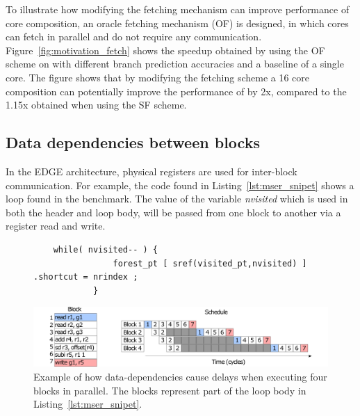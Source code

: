To illustrate how modifying the fetching mechanism can improve performance of core composition, an oracle fetching mechanism (OF) is designed, in which cores can fetch in parallel and do not require any communication.
Figure~\ref{fig:motivation_fetch} shows the speedup obtained by using the OF scheme on  with different branch prediction accuracies and a baseline of a single core.
The figure shows that by modifying the fetching scheme a 16 core composition can potentially improve the performance of  by 2x, compared to the 1.15x obtained when using the SF scheme.

\subsection{Data dependencies between blocks}

In the EDGE architecture, physical registers are used for inter-block communication.
For example, the code found in Listing~\ref{lst:mser_snipet} shows a loop found in the  benchmark.
The value of the variable \textit{nvisited} which is used in both the header and loop body, will be passed from one block to another via a register read and write.


\begin{figure}[t]
\lstset{language=C,numbersep=4pt}
\begin{center}
\begin{lstlisting}
	while( nvisited-- ) {
				forest_pt [ sref(visited_pt,nvisited) ] .shortcut = nrindex ;
			}
\end{lstlisting}
\end{center}
\vspace{-2em}
\label{lst:mser_snipet}
    \centering
    \includegraphics[width=1\textwidth]{chapter3/graphics/mser_ex.pdf}
    \caption{Example of how data-dependencies cause delays when executing four blocks in parallel. The blocks represent part of the loop body in Listing~\ref{lst:mser_snipet}.}
    \label{fig:mser_nvsited}
	\vspace{1em}
\end{figure}

